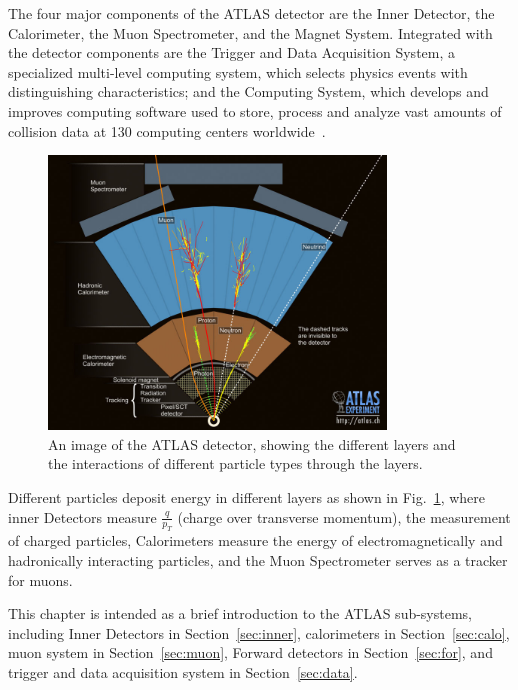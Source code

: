 \par The four major components of the ATLAS detector are the Inner Detector, the Calorimeter, the Muon Spectrometer, and the Magnet System. Integrated with the detector components are the Trigger and Data Acquisition System, a specialized multi-level computing system, which selects physics events with distinguishing characteristics; and the Computing System, which develops and improves computing software used to store, process and analyze vast amounts of collision data at 130 computing centers worldwide~\cite{atlas}.

\begin{figure}[htbp]
    \centering
    \includegraphics[width=0.8\textwidth]{chapters/c4/figures/eve_gen.jpg}
    \caption{An image of the ATLAS detector, showing the different layers and the interactions of different particle types through the layers.}
    \label{fig:eve-gen}
\end{figure}

\par Different particles deposit energy in different layers as shown in Fig.~\ref{fig:eve-gen}, where inner Detectors measure $\frac{q}{p_T}$ (charge over transverse momentum), the measurement of charged particles, Calorimeters measure the energy of electromagnetically and hadronically interacting particles, and the Muon Spectrometer serves as a tracker for muons.

\par This chapter is intended as a brief introduction to the ATLAS sub-systems, including Inner Detectors in Section~\ref{sec:inner}, calorimeters in Section~\ref{sec:calo}, muon system in Section~\ref{sec:muon}, Forward detectors in Section~\ref{sec:for}, and trigger and data acquisition system in Section~\ref{sec:data}.


